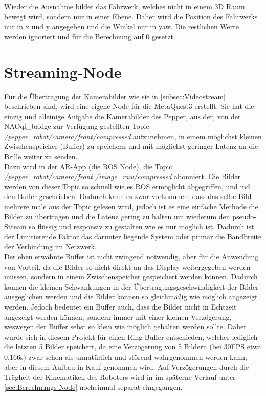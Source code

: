 \noindent
Wieder die Ausnahme bildet das Fahrwerk, welches nicht in einem 3D Raum bewegt wird, sondern nur in einer Ebene. Daher wird die Position des Fahrwerks nur in x und y angegeben und die Winkel nur in yaw. Die restlichen Werte werden ignoriert und für die Berechnung auf 0 gesetzt.\\

\section{Streaming-Node}\label{sec:Streaming-Node}

Für die Übertragung der Kamerabilder wie sie in \autoref{subsec:Videostream} beschrieben sind, wird eine eigene Node für die MetaQuest3 erstellt. Sie hat die einzig und alleinige Aufgabe die Kamerabilder des Pepper, aus der, von der NAOqi\_bridge zur Verfügung gestellten Topic \textit{/pepper\_robot/camera/front/compressed} aufzunehmen, in einem möglichst kleinen Zwischenspeicher (Buffer) zu speichern und mit möglichst geringer Latenz an die Brille weiter zu senden.\\

\noindent
Dazu wird in der \ac{AR}-App (die \ac{ROS} Node), die Topic \textit{/pepper\_robot/camera/front /image\_raw/compressed} abonniert. Die Bilder werden von dieser Topic so schnell wie es \ac{ROS} ermöglicht abgegriffen, und ind den Buffer geschrieben. Dadurch kann es zwar vorkommen, dass das selbe Bild mehrere male aus der Topic gelesen wird, jedoch ist es eine einfache Methode die Bilder zu übertragen und die Latenz gering zu halten um wiederum den pseudo-Stream so flüssig und responsiv zu gestalten wie es nur möglich ist. Dadurch ist der Limitierende Faktor das darunter liegende System oder primär die Bandbreite der Verbindung im Netzwerk.
\\

\noindent
Der eben erwähnte Buffer ist nicht zwingend notwendig, aber für die Anwendung von Vorteil, da die Bilder so nicht direkt an das Display weitergegeben werden müssen, sondern in einem Zwischenspeicher gespeichert werden können. Dadurch können die kleinen Schwankungen in der Übertragungsgeschwindigkeit der Bilder ausgeglichen werden und die Bilder können so gleichmäßig wie möglich angezeigt werden. Jedoch bedeutet ein Buffer auch, dass die Bilder nicht in Echtzeit angezeigt werden können, sondern immer mit einer kleinen Verzögerung, weswegen der Buffer sebst so klein wie möglich gehalten werden sollte. Daher wurde sich in diesem Projekt für einen Ring-Buffer entschieden, welcher lediglich die letzten 5 Bilder speichert, da eine Verzögerung von 5 Bildern (bei 30\ac{FPS} etwa 0.166s) zwar schon als unnatürlich und störend wahrgenommen werden kann, aber in diesem Aufbau in Kauf genommen wird. Auf Verzögerungen durch die Trägheit der Kinematiken des Roboters wird in im späterne Verlauf unter \autoref{sec:Berechnungs-Node} nocheinmal separat eingegangen.
\\

